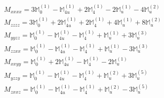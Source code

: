 \documentclass[fleqn,8pt,landscape]{jsarticle}
\begin{document}
\begin{align*}
& M_{xxxx} = 3 \mathbb{M}_{0}^{(1)} - \mathbb{M}_{4u}^{(1)} + 2 \mathbb{M}_{4}^{(1)} - 2 \mathbb{M}_{u}^{(1)} - 4 \mathbb{M}_{u}^{(2)} \\
& M_{zzzz} = 3 \mathbb{M}_{0}^{(1)} + 2 \mathbb{M}_{4u}^{(1)} + 2 \mathbb{M}_{4}^{(1)} + 4 \mathbb{M}_{u}^{(1)} + 8 \mathbb{M}_{u}^{(2)} \\
& M_{yyzz} = \mathbb{M}_{0}^{(1)} - \mathbb{M}_{4u}^{(1)} - \mathbb{M}_{4}^{(1)} + \mathbb{M}_{u}^{(1)} + 3 \mathbb{M}_{u}^{(3)} \\
& M_{zzxx} = \mathbb{M}_{0}^{(1)} - \mathbb{M}_{4u}^{(1)} - \mathbb{M}_{4}^{(1)} + \mathbb{M}_{u}^{(1)} - 3 \mathbb{M}_{u}^{(3)} \\
& M_{xxyy} = \mathbb{M}_{0}^{(1)} + 2 \mathbb{M}_{4u}^{(1)} - \mathbb{M}_{4}^{(1)} - 2 \mathbb{M}_{u}^{(1)} \\
& M_{yzzy} = \mathbb{M}_{0}^{(1)} - \mathbb{M}_{4u}^{(1)} - \mathbb{M}_{4}^{(1)} + \mathbb{M}_{u}^{(2)} + 3 \mathbb{M}_{u}^{(5)} \\
& M_{zxxz} = \mathbb{M}_{0}^{(1)} - \mathbb{M}_{4u}^{(1)} - \mathbb{M}_{4}^{(1)} + \mathbb{M}_{u}^{(2)} - 3 \mathbb{M}_{u}^{(5)}
\end{align*}
\end{document}
